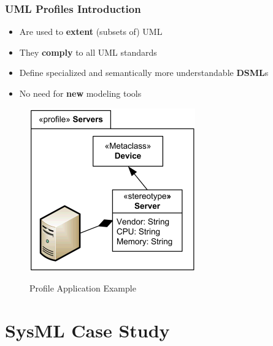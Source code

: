 \documentclass[10pt]{beamer}
\begin{document}
\begin{frame}
\frametitle{UML Profiles Introduction}
\begin{itemize}
  \item Are used to \textbf{extent} (subsets of) UML
  \item They \textbf{comply} to all UML standards
  \item Define specialized and semantically more understandable \textbf{DSML}s
  \item No need for \textbf{new} modeling tools  
\end{itemize}
\begin{center}
\begin{figure}%
\includegraphics[scale=3.0]{uml_profiled}\\
\caption{Profile Application Example \cite{UMLprofiled}}
\end{figure}
\end{center}
\end{frame}
\section{SysML Case Study}
\end{document}
